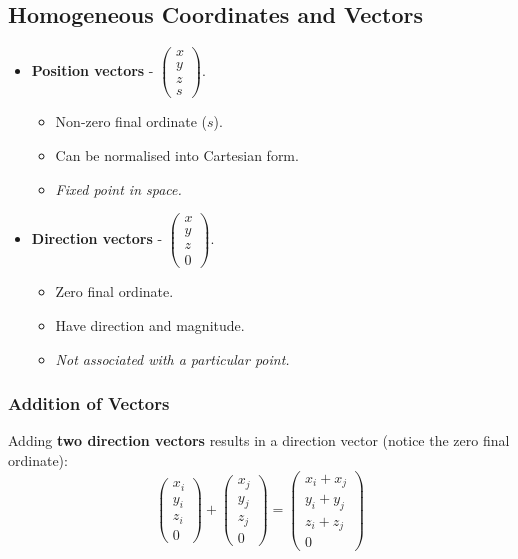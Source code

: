 \documentclass[11pt]{article}
\begin{document}
\subsection{Homogeneous Coordinates and Vectors}
\begin{itemize}
  \item \textbf{Position vectors} - $\begin{pmatrix} x \\ y \\ z \\ s \end{pmatrix}$.
    \begin{itemize}
      \item Non-zero final ordinate ($s$).
      \item Can be normalised into Cartesian form.
      \item \textit{Fixed point in space.}
    \end{itemize}
  \item \textbf{Direction vectors} - $\begin{pmatrix} x \\ y \\ z \\ 0 \end{pmatrix}$.
    \begin{itemize}
      \item Zero final ordinate.
      \item Have direction and magnitude.
      \item \textit{Not associated with a particular point.}
    \end{itemize}
\end{itemize}

\subsubsection{Addition of Vectors}
Adding \textbf{two direction vectors} results in a direction vector (notice the zero final ordinate):
\[
  \begin{pmatrix} x_i \\ y_i \\ z_i \\ 0 \end{pmatrix} 
  +
  \begin{pmatrix} x_j \\ y_j \\ z_j \\ 0 \end{pmatrix} 
  =
  \begin{pmatrix} x_i + x_j \\ y_i + y_j \\ z_i + z_j \\ 0 \end{pmatrix} 
\]
\end{document}
